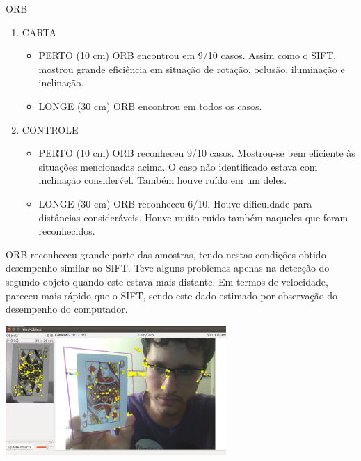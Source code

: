 \documentclass[conference]{IEEEtran}
\begin{document}
\centering  ORB
  \begin{enumerate}
  \item CARTA
    \begin{itemize}
     \item PERTO (10 cm)
      ORB encontrou em 9/10 casos. Assim como o SIFT, mostrou grande efici\^encia em situa\c{c}\~ao de rota\c{c}\~ao, 
      oclus\~ao, ilumina\c{c}\~ao e inclina\c{c}\~ao.
     \item LONGE (30 cm)
      ORB encontrou em todos os casos.
    \end{itemize}
  \item CONTROLE
    \begin{itemize}
     \item PERTO (10 cm)
      ORB reconheceu 9/10 casos. Mostrou-se bem eficiente \`as situa\c{c}\~oes mencionadas acima. O caso n\~ao identificado 
      estava com inclina\c{c}\~ao consider\'vel. Tamb\'em houve ru\'ido em um deles.
     \item LONGE (30 cm)
      ORB reconheceu 6/10. Houve dificuldade para dist\^ancias consider\'aveis. Houve muito ru\'ido tamb\'em naqueles que 
      foram reconhecidos.
    \end{itemize}
 \end{enumerate}
	
\vspace{1.2\baselineskip}\vspace{-\parskip} 
\raggedright
\nobreak\hspace{.16667em plus .08333em} 
 ORB reconheceu grande parte das amostras, tendo nestas condi\c{c}\~oes obtido desempenho similar ao SIFT. Teve alguns problemas 
 apenas na detec\c{c}\~ao do segundo objeto quando este estava mais distante. Em termos de velocidade, pareceu mais r\'apido 
 que o SIFT, sendo este dado estimado por observa\c{c}\~ao do desempenho do computador.

 		\vspace{2\baselineskip}\vspace{-\parskip}
 		\begin{minipage}{\linewidth}
 		\centering
 		\includegraphics[width=3.3in]{cartaperto5}
 		\end{minipage}	
 
\end{document}
